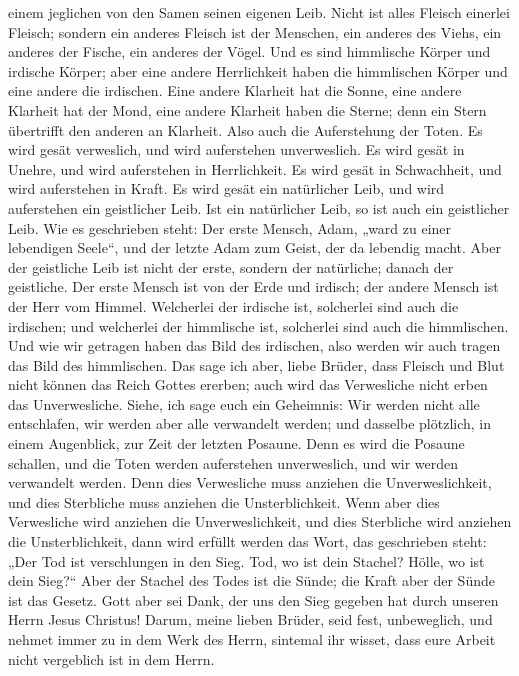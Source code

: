 einem jeglichen von den Samen seinen eigenen Leib.  Nicht
ist alles Fleisch einerlei Fleisch; sondern ein anderes Fleisch ist der
Menschen, ein anderes des Viehs, ein anderes der Fische, ein anderes der
Vögel.  Und es sind himmlische Körper und irdische
Körper; aber eine andere Herrlichkeit haben die himmlischen Körper und
eine andere die irdischen.  Eine andere Klarheit hat die
Sonne, eine andere Klarheit hat der Mond, eine andere Klarheit haben die
Sterne; denn ein Stern übertrifft den anderen an Klarheit.
 Also auch die Auferstehung der Toten. Es wird gesät
verweslich, und wird auferstehen unverweslich.  Es wird
gesät in Unehre, und wird auferstehen in Herrlichkeit. Es wird gesät in
Schwachheit, und wird auferstehen in Kraft.  Es wird
gesät ein natürlicher Leib, und wird auferstehen ein geistlicher Leib.
Ist ein natürlicher Leib, so ist auch ein geistlicher Leib.
 Wie es geschrieben steht: Der erste Mensch, Adam, „ward
zu einer lebendigen Seele``, und der letzte Adam zum Geist, der da
lebendig macht.  Aber der geistliche Leib ist nicht der
erste, sondern der natürliche; danach der geistliche. 
Der erste Mensch ist von der Erde und irdisch; der andere Mensch ist der
Herr vom Himmel.  Welcherlei der irdische ist, solcherlei
sind auch die irdischen; und welcherlei der himmlische ist, solcherlei
sind auch die himmlischen.  Und wie wir getragen haben
das Bild des irdischen, also werden wir auch tragen das Bild des
himmlischen.  Das sage ich aber, liebe Brüder, dass
Fleisch und Blut nicht können das Reich Gottes ererben; auch wird das
Verwesliche nicht erben das Unverwesliche.  Siehe, ich
sage euch ein Geheimnis: Wir werden nicht alle entschlafen, wir werden
aber alle verwandelt werden;  und dasselbe plötzlich, in
einem Augenblick, zur Zeit der letzten Posaune. Denn es wird die Posaune
schallen, und die Toten werden auferstehen unverweslich, und wir werden
verwandelt werden.  Denn dies Verwesliche muss anziehen
die Unverweslichkeit, und dies Sterbliche muss anziehen die
Unsterblichkeit.  Wenn aber dies Verwesliche wird
anziehen die Unverweslichkeit, und dies Sterbliche wird anziehen die
Unsterblichkeit, dann wird erfüllt werden das Wort, das geschrieben
steht:  „Der Tod ist verschlungen in den Sieg. Tod, wo
ist dein Stachel? Hölle, wo ist dein Sieg?{}``  Aber der
Stachel des Todes ist die Sünde; die Kraft aber der Sünde ist das
Gesetz.  Gott aber sei Dank, der uns den Sieg gegeben hat
durch unseren Herrn Jesus Christus!  Darum, meine lieben
Brüder, seid fest, unbeweglich, und nehmet immer zu in dem Werk des
Herrn, sintemal ihr wisset, dass eure Arbeit nicht vergeblich ist in dem
Herrn.


